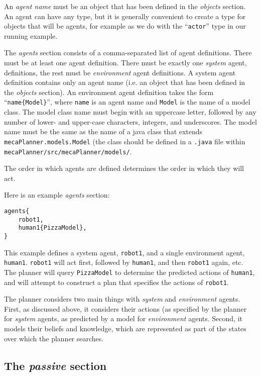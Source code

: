 \documentclass{article}
\begin{document}
An \emph{agent name} must be an object that has been defined in the
\emph{objects} section. An agent can have any type, but it is generally
convenient to create a type for objects that will be agents, for example 
as we do with the ``\texttt{actor}'' type in our running example.

The \emph{agents} section consists of a comma-separated list of agent
definitions. There must be at least one agent definition. There must be exactly
one \emph{system} agent, definitions, the rest must be \emph{environment} agent
definitions. A system agent definition contains only an agent name (i.e. an
object that has been defined in the \emph{objects} section). An environment
agent definition takes the form ``\texttt{name\{Model\}}'', where \texttt{name}
is an agent name and \texttt{Model} is the name of a model class. The model
class name must begin with an uppercase letter, followed by any number of
lower- and upper-case characters, integers, and underscores. The model name must
be the same as the name of a java class that extends
\texttt{mecaPlanner.models.Model} (the class should be defined in a
\texttt{.java} file within \texttt{mecaPlanner/src/mecaPlanner/models/}.

The order in which agents are defined determines the order in which they will
act.

Here is an example \emph{agents} section:
\begin{verbatim}
agents{
    robot1,
    human1{PizzaModel},
}
\end{verbatim}

This example defines a system agent, \texttt{robot1}, and a single environment
agent, \texttt{human1}. \texttt{robot1} will act first, followed by
\texttt{human1}, and then \texttt{robot1} again, etc. The planner will query
\texttt{PizzaModel} to determine the predicted actions of \texttt{human1}, and
will attempt to construct a plan that specifies the actions of \texttt{robot1}.

The planner considers two main things with \emph{system} and \emph{environment}
agents. First, as discussed above, it considers their actions (as specified by
the planner for \emph{system} agents, as predicted by a model for
\emph{environment} agents. Second, it models their beliefs and knowledge, which
are represented as part of the states over which the planner searches.


\subsection{The \emph{passive} section}
\end{document}
